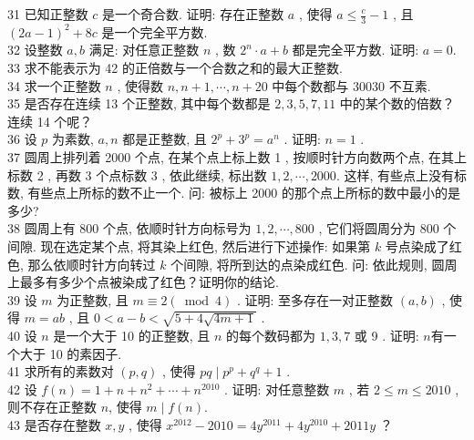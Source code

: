 31 已知正整数 $c$ 是一个奇合数. 证明: 存在正整数 $a$ , 使得 $a \leqslant \frac{c}{3}-1$ , 且 $(2 a-1)^{2}+8 c$ 是一个完全平方数.\\
32 设整数 $a ,  b$ 满足: 对任意正整数 $n$ , 数 $2^{n} \cdot a+b$ 都是完全平方数. 证明:  $a=0$.\\
33 求不能表示为 42 的正倍数与一个合数之和的最大正整数. \\
34 求一个正整数 $n$ , 使得数 $n, n+1, \cdots, n+20$ 中每个数都与 30030 不互素. \\
35 是否存在连续 13 个正整数, 其中每个数都是 $2 ,  3 ,  5 ,  7 ,  11$ 中的某个数的倍数？连续 14 个呢？\\
36 设 $p$ 为素数,  $a ,  n$ 都是正整数, 且 $2^{p}+3^{p}=a^{n}$ . 证明:  $n=1$ . \\
37 圆周上排列着 2000 个点, 在某个点上标上数 1 , 按顺时针方向数两个点, 在其上标数 2 , 再数 3 个点标数 3 , 依此继续, 标出数 $1,2, \cdots, 2000$. 这样, 有些点上没有标数, 有些点上所标的数不止一个. 问: 被标上 2000 的那个点上所标的数中最小的是多少?\\
38 圆周上有 800 个点, 依顺时针方向标号为 $1,2, \cdots, 800$ , 它们将圆周分为 800 个间隙. 现在选定某个点, 将其染上红色, 然后进行下述操作: 如果第 $k$ 号点染成了红色, 那么依顺时针方向转过 $k$ 个间隙, 将所到达的点染成红色. 问: 依此规则, 圆周上最多有多少个点被染成了红色？证明你的结论. \\
39 设 $m$ 为正整数, 且 $m \equiv 2(\bmod 4)$ . 证明: 至多存在一对正整数 $(a, b)$ , 使得 $m=a b$ , 且 $0<a-b<\sqrt{5+4 \sqrt{4 m+1}}$ . \\
40 设 $n$ 是一个大于 10 的正整数, 且 $n$ 的每个数码都为 $1 ,  3 ,  7$ 或 9 . 证明: $n$有一个大于 10 的素因子. \\
41 求所有的素数对 $(p, q)$ , 使得 $p q \mid p^{p}+q^{q}+1$ . \\
42 设 $f(n)=1+n+n^{2}+\cdots+n^{2010}$ . 证明: 对任意整数 $m$ , 若 $2 \leqslant m \leqslant 2010$ , 则不存在正整数 $n$, 使得 $m \mid f(n)$.\\
43 是否存在整数 $x ,  y$ , 使得 $x^{2012}-2010=4 y^{2011}+4 y^{2010}+2011 y$ ？

